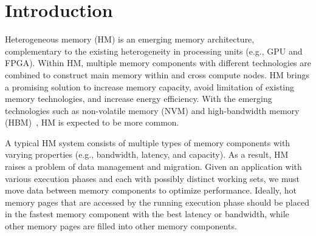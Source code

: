 \section{Introduction}

Heterogeneous memory (HM) is an emerging memory architecture, complementary to the existing heterogeneity in processing units (e.g., GPU and FPGA). Within HM, multiple memory components with different technologies are combined to construct main memory within and cross compute nodes. HM brings a promising solution to increase memory capacity, avoid limitation of existing memory technologies, and increase energy efficiency. With the emerging technologies such as non-volatile memory (NVM) and high-bandwidth memory (HBM)~\cite{hbm}, HM is expected to be more common.


A typical HM system consists of multiple types of memory components with varying properties (e.g., bandwidth, latency, and capacity). As a result, HM raises a problem of data management and migration. Given an application with various execution phases and each with possibly distinct working sets, we must move data between memory components to optimize performance. Ideally, hot memory pages that are accessed by the running execution phase should be placed in the fastest memory component with the best latency or bandwidth, while other memory pages are filled into other memory components. 


